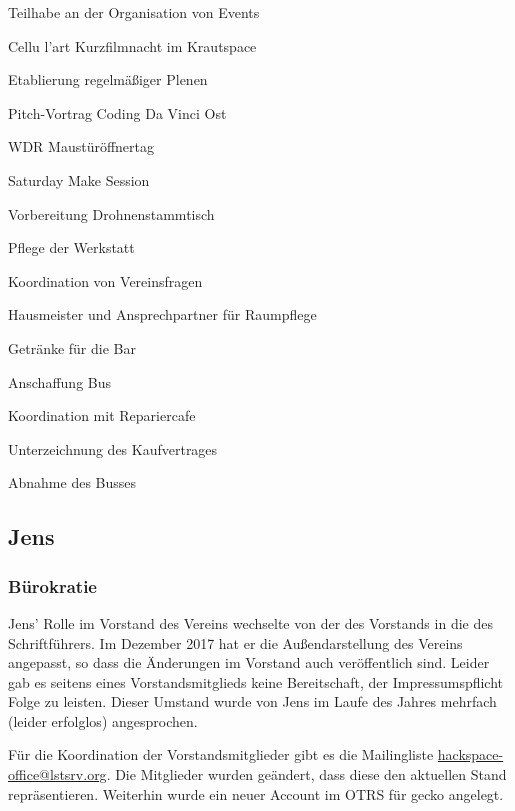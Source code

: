 \documentclass[ngerman]{scrartcl}
\begin{document}
\begin{compactitem}
    \item Teilhabe an der Organisation von Events
    \begin{compactitem}
        \item Cellu l'art Kurzfilmnacht im Krautspace
        \item Etablierung regelmäßiger Plenen
        \item Pitch-Vortrag Coding Da Vinci Ost
        \item WDR Maustüröffnertag
        \item Saturday Make Session
        \item Vorbereitung Drohnenstammtisch
    \end{compactitem}
    \item Pflege der Werkstatt
    \item Koordination von Vereinsfragen
    \item Hausmeister und Ansprechpartner für Raumpflege
    \item Getränke für die Bar
    \item Anschaffung Bus 
    \begin{compactitem}
        \item Koordination mit Repariercafe
        \item Unterzeichnung des Kaufvertrages
        \item Abnahme des Busses
    \end{compactitem}
\end{compactitem}

\subsection{Jens}

\subsubsection{Bürokratie}


Jens' Rolle im Vorstand des Vereins wechselte von der des Vorstands in die des
Schriftführers. Im Dezember 2017 hat er die Außendarstellung des Vereins
angepasst, so dass die Änderungen im Vorstand auch veröffentlich sind. Leider
gab es seitens eines Vorstandsmitglieds keine Bereitschaft, der
Impressumspflicht Folge zu leisten. Dieser Umstand wurde von Jens im Laufe des
Jahres mehrfach (leider erfolglos) angesprochen.

Für die Koordination der Vorstandsmitglieder gibt es die Mailingliste
\href{https://lstsrv.org/mailman/listinfo/hackspace-office}{hackspace-office@lstsrv.org}. Die
Mitglieder wurden geändert, dass diese den aktuellen Stand
repräsentieren. Weiterhin wurde ein neuer Account im OTRS für gecko angelegt.
\end{document}
